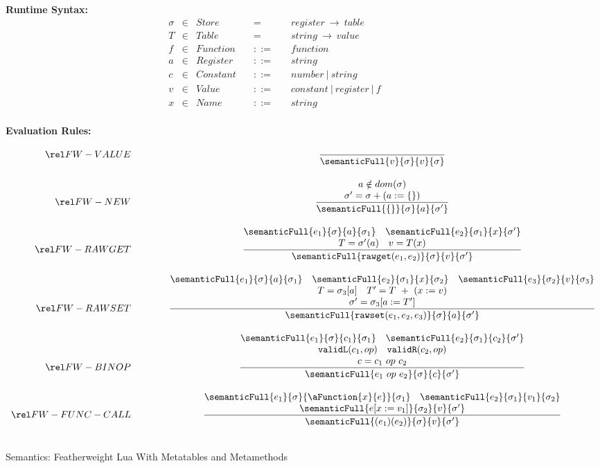 \begin{figure}[P]
\caption{Semantics: Featherweight Lua With Metatables and Metamethods}
{\bf Runtime Syntax:}
\label{fig:FW2.1Sem}
\[
\begin{array}{rclcl}
  \sigma & \in & {Store} \quad  & = & \quad {register} ~\rightarrow ~{table} \\
  T & \in & {Table} \quad  & = & \quad {string} ~\rightarrow ~{value} \\
  f & \in & {Function} \quad & ::= & \quad function \\
  a & \in & {Register} \quad & ::= & \quad string~ \\
  c & \in & {Constant} \quad & ::= & \quad number~|~string~ \\
  v & \in & {Value} \quad & ::= & \quad constant~|~ register ~|~ f~ \\
  x & \in & {Name} \quad & ::= & \quad string 
  \\
\end{array}
\]

{\bf Evaluation Rules:~~~ } \\
\[
\begin{array}{r@{\qquad\qquad}c}
\ssrule{FW-VALUE}{
}{
  \semanticFull {v}{\sigma} {v}{\sigma}
}
\ssrule{FW-NEW}{
  a \notin dom(\sigma)\\
  \sigma' = \sigma + (a := \{\})
}{
  \semanticFull {\{\}} {\sigma}   {a} {\sigma'}
}

\ssrule{FW-RAWGET}{
  \semanticFull{e_1}  {\sigma}    {a}  {\sigma_1} \quad
  \semanticFull{e_2}  {\sigma_1}    {x}  {\sigma'} \\
  T = \sigma'(a)\quad
  v = T(x)\\
  
}{
  \semanticFull {{\tt rawget}(e_1,e_2)} {\sigma}   {v} {\sigma'}
}
\ssrule{FW-RAWSET}{
  \semanticFull{e_1}{\sigma}{a}{\sigma_1} \quad
  \semanticFull{e_2}{\sigma_1}{x}{\sigma_2} \quad
  \semanticFull{e_3}{\sigma_2}{v}{\sigma_3} \\
  T = \sigma_3[a] \quad
  T' = T~+~(x := v) \\
  \sigma' = \sigma_3[a:=T']
}{
  \semanticFull{{\tt rawset}(e_1,e_2,e_3)}{\sigma}{a}{\sigma'}
}
\ssrule{FW-BINOP}{
  \semanticFull{e_1}{\sigma}{c_1}{\sigma_1} \quad
  \semanticFull{e_2}{\sigma_1}{c_2}{\sigma'} \\
  {\tt validL}(c_1, op) \quad
  {\tt validR}(c_2, op) \\
  c = c_1 ~op~ c_2
}{
  \semanticFull{e_1 ~op~ e_2}{\sigma}{c}{\sigma'}
}
\ssrule{FW-FUNC-CALL}{
  \semanticFull{e_1}{\sigma}{\aFunction{x}{e}}{\sigma_1} \quad
  \semanticFull{e_2}{\sigma_1}{v_1}{\sigma_2} \\
  \semanticFull{e[x:=v_1]}{\sigma_2}{v}{\sigma'} 
}{
  \semanticFull{(e_1)(e_2)}{\sigma}{v}{\sigma'} 
}
\end{array}
\]
\end{figure}
